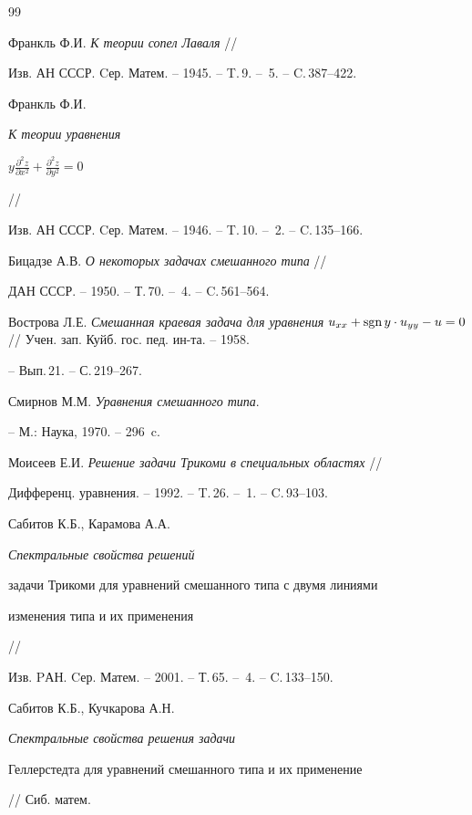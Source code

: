 \begin{thebibliography}{99}







Франкль Ф.И. {\em К теории сопел Лаваля} // 


Изв. АН СССР. Cер. Матем. -- 1945. -- T.\,9. -- \No\,5. -- C.\,387--422.




Франкль Ф.И. {\em К теории уравнения


$y\frac{\partial^2z}{\partial x^2}+\frac{\partial^2z}{\partial y^2}=0$} //


Изв. АН СССР. Cер. Матем. -- 1946. -- T.\,10. -- \No\,2. -- C.\,135--166.




Бицадзе А.В. {\em О некоторых задачах смешанного типа} //


ДАН СССР. -- 1950. -- Т.\,70. -- \No\,4. -- C.\,561--564.




Вострова Л.Е. {\em Смешанная краевая задача для уравнения $u_{xx}+\sgn


y\cdot u_{yy}-u=0$} // Учен. зап. Куйб. гос. пед. ин-та. -- 1958. 


-- Вып.\,21. -- С.\,219--267.




Смирнов М.М. {\em Уравнения смешанного типа}.


-- М.: Наука, 1970. -- 296~c.




Моисеев Е.И. {\em Решение задачи Трикоми в специальных областях} // 


Дифференц. уравнения. -- 1992. -- T.\,26. -- \No\,1. -- C.\,93--103.




Сабитов К.Б., Карамова А.А. {\em Спектральные свойства решений 


задачи Трикоми для уравнений смешанного типа с двумя линиями 


изменения типа и их применения} //


Изв. PАН. Cер. Матем. -- 2001. -- Т.\,65. -- \No\,4. -- C.\,133--150.




Сабитов К.Б., Кучкарова А.Н. {\em Спектральные свойства решения задачи 


Геллерстедта для уравнений смешанного типа и их применение} // Сиб. матем. 



\end{thebibliography}
